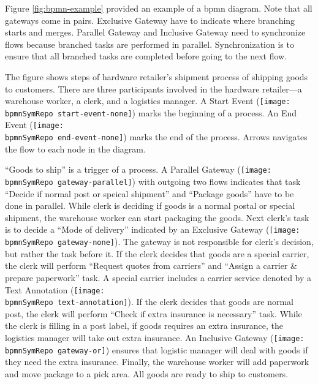 Figure \ref{fig:bpmn-example} provided an example of a \gls{bpmn} diagram.
Note that all gateways come in pairs.
Exclusive Gateway have to indicate where branching starts and merges.
Parallel Gateway and Inclusive Gateway need to synchronize flows because branched tasks are performed in parallel.
Synchronization is to ensure that all branched tasks are completed before going to the next flow.

The figure shows steps of hardware retailer's shipment process of shipping goods to customers.
There are three participants involved in the hardware retailer---a warehouse worker, a clerk, and a logistics manager.
A Start Event (\texttt{[image: \\bpmnSymRepo start-event-none]}) marks the beginning of a process.
An End Event (\texttt{[image: \\bpmnSymRepo end-event-none]}) marks the end of the process.
Arrows navigates the flow to each node in the diagram.

\enquote{Goods to ship} is a trigger of a process.
A Parallel Gateway (\texttt{[image: \\bpmnSymRepo gateway-parallel]}) with outgoing two flows indicates that task \enquote{Decide if normal post or speical shipment} and \enquote{Package goods} have to be done in parallel.
While clerk is deciding if goods is a normal postal or special shipment, the warehouse worker can start packaging the goods.
Next clerk's task is to decide a \enquote{Mode of delivery} indicated by an Exclusive Gateway (\texttt{[image: \\bpmnSymRepo gateway-none]}).
The gateway is not responsible for clerk's decision, but rather the task before it.
If the clerk decides that goods are a special carrier, the clerk will perform \enquote{Request quotes from carriers} and \enquote{Assign a carrier \& prepare paperwork} task.
A special carrier includes a carrier service denoted by a Text Annotation (\texttt{[image: \\bpmnSymRepo text-annotation]}).
If the clerk decides that goods are normal post, the clerk will perform \enquote{Check if extra insurance is necessary} task.
While the clerk is filling in a post label, if goods requires an extra insurance, the logistics manager will take out extra insurance.
An Inclusive Gateway (\texttt{[image: \\bpmnSymRepo gateway-or]}) ensures that logistic manager will deal with goods if they need the extra insurance.
Finally, the warehouse worker will add paperwork and move package to a pick area.
All goods are ready to ship to customers.